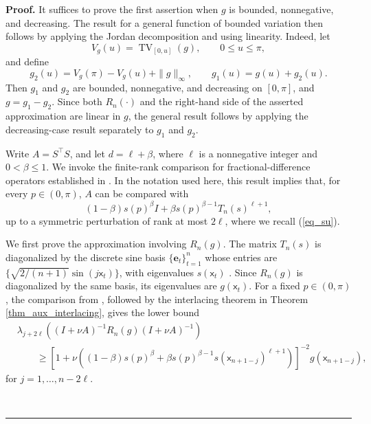 \documentclass[11pt]{article}
\newcommand{\sfx}{\mathsf{x}}
\newenvironment{proof}[1][Proof]{\noindent\textbf{#1.} }{\ \rule{0.5em}{0.5em}}
\numberwithin{equation}{section}
\numberwithin{figure}{section}
\begin{document}
\begin{proof}
It suffices to prove the first assertion when \(g\) is bounded, nonnegative, and decreasing. The result for a general function of bounded variation then follows by applying the Jordan decomposition and using linearity. Indeed, let
\[
V_g(u)=\operatorname{TV}_{[0,u]}(g),
\qquad 0\leq u\leq\pi,
\]
and define
\[
g_2(u)=V_g(\pi)-V_g(u)+\|g\|_\infty,
\qquad
g_1(u)=g(u)+g_2(u).
\]
Then \(g_1\) and \(g_2\) are bounded, nonnegative, and decreasing on \([0,\pi]\), and \(g=g_1-g_2\). Since both \(R_n(\cdot)\) and the right-hand side of the asserted approximation are linear in \(g\), the general result follows by applying the decreasing-case result separately to \(g_1\) and \(g_2\).



Write \(A=S^\top S\), and let \(d=\ell+\beta\), where \(\ell\) is a nonnegative integer and \(0<\beta\leq1\). We invoke the finite-rank comparison for fractional-difference operators established in \cite{BURMAN2006677}. In the notation used here, this result implies that, for every \(p\in(0,\pi)\), \(A\) can be compared with
\begin{equation*}
(1-\beta)s(p)^\beta I
+
\beta s(p)^{\beta-1}T_n(s)^{\ell+1},
\end{equation*}
up to a symmetric perturbation of rank at most \(2\ell\), where we recall (\ref{eq_su}). 

We first prove the approximation involving \(R_n(g)\). The matrix \(T_n(s)\) is diagonalized by the discrete sine basis \(\{\bm{e}_t\}_{t=1}^n\) whose entries are $\{\sqrt{2/(n+1)} \sin(j \sfx_t)\}$, with eigenvalues \(s(\sfx_t)\) \cite{grenander_szego_1958}. Since \(R_n(g)\) is diagonalized by the same basis, its eigenvalues are \(g(\sfx_t)\). For a fixed \(p\in(0,\pi)\), the comparison from \cite[Theorem~6(a) and Theorem~7(b), (d)]{BURMAN2006677}, followed by the interlacing theorem in Theorem \ref{thm_aux_interlacing}, gives the lower bound
\begin{align*}
&\lambda_{j+2\ell}\!\left(
(I+\nu A)^{-1}
R_n(g)
(I+\nu A)^{-1}
\right) \\
&\qquad \geq
\left[
1+\nu\left(
(1-\beta)s(p)^\beta
+
\beta s(p)^{\beta-1}s(\sfx_{n+1-j})^{\ell+1}
\right)
\right]^{-2}
g(\sfx_{n+1-j}),
\end{align*}
for \(j=1,\ldots,n-2\ell\).


\end{proof}
\end{document}
